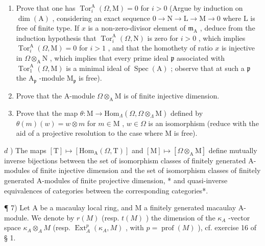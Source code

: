 \begin{enumerate}
\def\labelenumi{\alph{enumi})}
\item
  Prove that one has \(\operatorname{Tor}_{i}^{\mathrm{A}}(\Omega, \mathrm{M}) = 0\) for \(i > 0\) (Argue by induction on \(\dim(\mathrm{A})\) , considering an exact sequence \(0 \to \mathrm{N} \to \mathrm{L} \to \mathrm{M} \to 0\) where \(\mathrm{L}\) is free of finite type. If \(x\) is a non-zero-divisor element of \(\mathfrak{m}_{\mathrm{A}}\) , deduce from the induction hypothesis that \(\operatorname{Tor}_{i}^{\mathrm{A}}(\Omega, \mathrm{N})\) is zero for \(i > 0\) , which implies \(\operatorname{Tor}_{i}^{\mathrm{A}}(\Omega, \mathrm{M}) = 0\) for \(i > 1\) , and that the homothety of ratio \(x\) is injective in \(\Omega \otimes_{\mathrm{A}} \mathrm{N}\) , which implies that every prime ideal \(\mathfrak{p}\) associated with \(\operatorname{Tor}_{1}^{\mathrm{A}}(\Omega, \mathrm{M})\) is a minimal ideal of \(\operatorname{Spec}(\mathrm{A})\) ; observe that at such a \(\mathfrak{p}\) the \(\mathrm{A}_{\mathfrak{p}}\) -module \(\mathrm{M}_{\mathfrak{p}}\) is free).
\item
  Prove that the A-module \(\Omega\otimes_{\mathrm{A}}\mathrm{M}\) is of finite injective dimension.
\item
  Prove that the map \(\theta: \mathrm{M} \to \mathrm{Hom}_{\Lambda}(\Omega, \Omega \otimes_{\Lambda} \mathrm{M})\) defined by \(\theta(m)(w) = w \otimes m\) for \(m \in \mathrm{M}\) , \(w \in \Omega\) is an isomorphism (reduce with the aid of a projective resolution to the case where M is free).
\end{enumerate}

\(d\) ) The maps \([\mathrm{T}] \mapsto [\mathrm{Hom}_{\mathrm{A}}(\Omega, \mathrm{T})]\) and \([\mathrm{M}] \mapsto [\Omega \otimes_{\mathrm{A}} \mathrm{M}]\) define mutually inverse bijections between the set of isomorphism classes of finitely generated A-modules of finite injective dimension and the set of isomorphism classes of finitely generated A-modules of finite projective dimension, * and quasi-inverse equivalences of categories between the corresponding categories*.

¶ 7) Let A be a macaulay local ring, and M a finitely generated macaulay A-module. We denote by \(r(M)\) (resp. \(t(M)\) ) the dimension of the \(\kappa_{A}\) -vector space \(\kappa_{A} \otimes_{A} M\) (resp. \(\operatorname{Ext}_{A}^{p}(\kappa_{A}, M)\) , with \(p = \operatorname{prof}(M)\) ), cf. exercise 16 of § 1.

